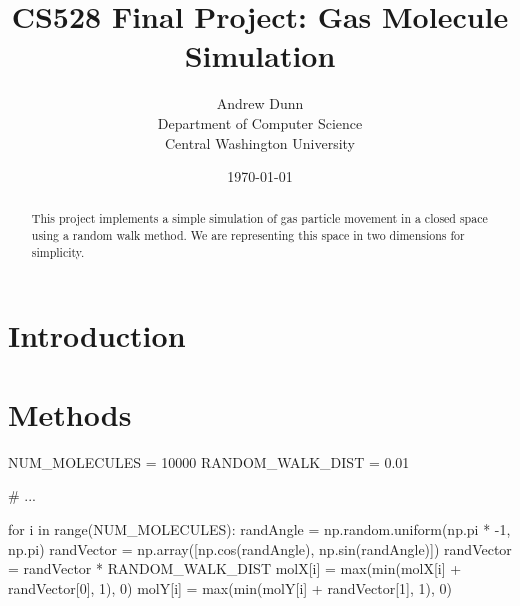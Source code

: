 \documentclass[12pt,a4paper]{article}
\title{\huge{\textbf{CS528 Final Project: Gas Molecule Simulation}}}
\author{
	Andrew Dunn\\
	Department of Computer Science\\
	Central Washington University}
\date{\today}
\begin{document}
	
	\maketitle
	\thispagestyle{empty}
	
	\clearpage %
	
	\begin{abstract}
		This project implements a simple simulation of gas particle movement in a closed space using a random walk method. We are representing this space in two dimensions for simplicity.
	\end{abstract}
	\thispagestyle{empty}
	
	\clearpage %
	
	\section{Introduction} %

	
	
	\section{Methods}\label{methods}

	\begin{python}
	NUM_MOLECULES = 10000
	RANDOM_WALK_DIST = 0.01
	
	# ...
	
	for i in range(NUM_MOLECULES):
		randAngle = np.random.uniform(np.pi * -1, np.pi)
		randVector = np.array([np.cos(randAngle), np.sin(randAngle)])
		randVector = randVector * RANDOM_WALK_DIST
		molX[i] = max(min(molX[i] + randVector[0], 1), 0)
		molY[i] = max(min(molY[i] + randVector[1], 1), 0)
	\end{python}
	
\end{document}
